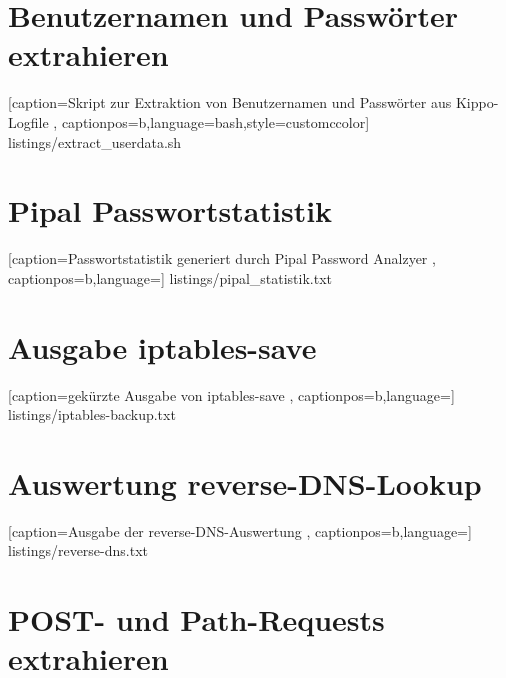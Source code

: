 \newpage

\section*{Benutzernamen und Passwörter extrahieren}
\label{app:Benutzernamen und Passwörter extrahieren}


    [caption={Skript zur Extraktion von Benutzernamen und Passwörter aus Kippo-Logfile}
       \label{lst:mitm_onmsg},
       captionpos=b,language=bash,style=customccolor]
 {listings/extract_userdata.sh}
 
 
\newpage
 
\section*{Pipal Passwortstatistik}
\label{app:Pipal Passwortstatistik}


    [caption={Passwortstatistik generiert durch Pipal Password Analzyer}
       \label{lst:mitm_onmsg},
       captionpos=b,language={}]
 {listings/pipal_statistik.txt}
 
 
\newpage 
 
\section*{Ausgabe iptables-save}
\label{app:Ausgabe iptables-save}


    [caption={gekürzte Ausgabe von iptables-save}
       \label{lst:mitm_onmsg},
       captionpos=b,language={}]
 {listings/iptables-backup.txt}
 

\newpage 
 
\section*{Auswertung reverse-DNS-Lookup}
\label{app:Auswertung reverse-DNS-Lookup}


    [caption={Ausgabe der reverse-DNS-Auswertung}
       \label{lst:reverse_dns},
       captionpos=b,language={}]
 {listings/reverse-dns.txt}
 
 
\newpage 
 
\section*{POST- und Path-Requests extrahieren}
\label{app:POST- und Path-Requests extrahieren}

